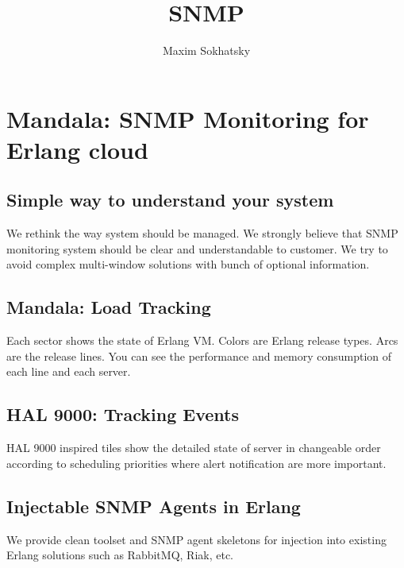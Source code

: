 \documentclass[11pt]{article}
\begin{document}
\title{SNMP}
\author{Maxim Sokhatsky}

\paragraph{}
\section*{Mandala: SNMP Monitoring for Erlang cloud}
\subsection*{Simple way to understand your system}
We rethink the way system should be managed. We strongly believe that
SNMP monitoring system should be clear and understandable to customer.
We try to avoid complex multi-window solutions with bunch of optional information.

\subsection*{Mandala: Load Tracking}

Each sector shows the state of Erlang VM. Colors are Erlang release types.
Arcs are the release lines. You can see the performance and memory
consumption of each line and each server.

\subsection*{HAL 9000: Tracking Events}

HAL 9000 inspired tiles show the detailed state of server in changeable
order according to scheduling priorities where alert notification are more
important.

\subsection*{Injectable SNMP Agents in Erlang}
We provide clean toolset and SNMP agent skeletons for injection into existing Erlang
solutions such as RabbitMQ, Riak, etc.
\end{document}
